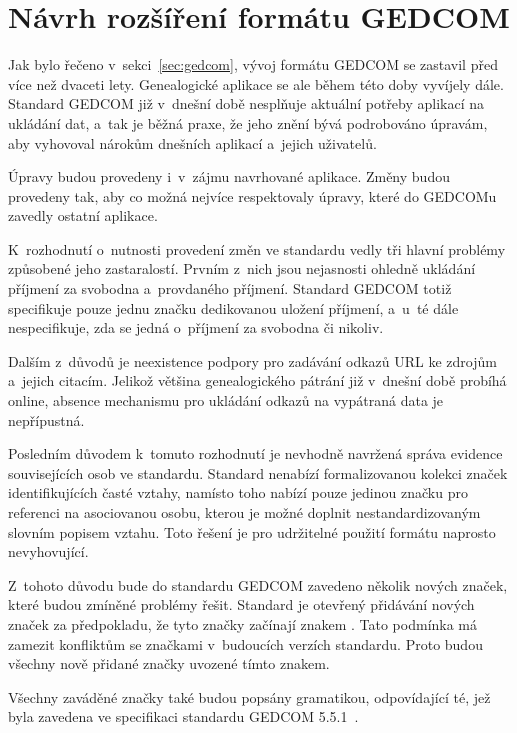 	\section{Návrh rozšíření formátu GEDCOM}
	\label{sec:designGedcom}
	Jak bylo řečeno v~sekci~\ref{sec:gedcom}, vývoj formátu GEDCOM se zastavil před více než dvaceti lety. Genealogické aplikace se ale během této doby vyvíjely dále. Standard GEDCOM již v~dnešní době nesplňuje aktuální potřeby aplikací na ukládání dat, a~tak je běžná praxe, že jeho znění bývá podrobováno úpravám, aby vyhovoval nárokům dnešních aplikací a~jejich uživatelů. \par
	Úpravy budou provedeny i~v~zájmu navrhované aplikace. Změny budou provedeny tak, aby co možná nejvíce respektovaly úpravy, které do GEDCOMu zavedly ostatní aplikace.\par
	K~rozhodnutí o~nutnosti provedení změn ve standardu vedly tři hlavní problémy způsobené jeho zastaralostí. Prvním z~nich jsou nejasnosti ohledně ukládání příjmení za svobodna a~provdaného příjmení. Standard GEDCOM totiž specifikuje pouze jednu značku dedikovanou uložení příjmení, a~u~té dále nespecifikuje, zda se jedná o~příjmení za svobodna či nikoliv.\par 
	Dalším z~důvodů je neexistence podpory pro zadávání odkazů URL ke zdrojům a~jejich citacím. Jelikož většina genealogického pátrání již v~dnešní době probíhá online, absence mechanismu pro ukládání odkazů na vypátraná data je nepřípustná.\par
	Posledním důvodem k~tomuto rozhodnutí je nevhodně navržená správa evidence souvisejících osob ve standardu. Standard nenabízí formalizovanou kolekci značek identifikujících časté vztahy, namísto toho nabízí pouze jedinou značku pro referenci na asociovanou osobu, kterou je možné doplnit nestandardizovaným slovním popisem vztahu. Toto řešení je pro udržitelné použití formátu naprosto nevyhovující.\par
	Z~tohoto důvodu bude do standardu GEDCOM zavedeno několik nových značek, které budou zmíněné problémy řešit. Standard je otevřený přidávání nových značek za předpokladu, že tyto značky začínají znakem \uv{\_}. Tato podmínka má zamezit konfliktům se značkami v~budoucích verzích standardu. Proto budou všechny nově přidané značky uvozené tímto znakem.\par
	Všechny zaváděné značky také budou popsány gramatikou, odpovídající té, jež byla zavedena ve specifikaci standardu GEDCOM 5.5.1~\cite{bib:Gedcom551Spec}.


